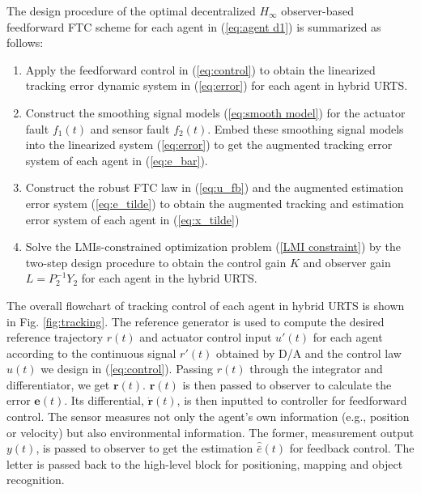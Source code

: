 \documentclass{ieeeaccess}
\begin{document}
The design procedure of the optimal decentralized $H_\infty$ observer-based feedforward FTC scheme for each agent in (\ref{eq:agent d1}) is summarized as follows:
\begin{enumerate}
    \item Apply the feedforward control in (\ref{eq:control}) to obtain the linearized tracking error dynamic system in (\ref{eq:error}) for each agent in hybrid URTS.
    \item Construct the smoothing signal models (\ref{eq:smooth model}) for the actuator fault $f_1(t)$ and sensor fault $f_2(t)$. Embed these smoothing signal models into the linearized system (\ref{eq:error}) to get the augmented tracking error system of each agent in (\ref{eq:e_bar}).
    \item Construct the robust FTC law in (\ref{eq:u_fb}) and the augmented estimation error system (\ref{eq:e_tilde}) to obtain the augmented tracking and estimation error system of each agent in (\ref{eq:x_tilde})
    \item Solve the LMIs-constrained optimization problem (\ref{LMI constraint}) by the two-step design procedure to obtain the control gain $K$ and observer gain $L=P_2^{-1}Y_2$ for each agent in the hybrid URTS.
\end{enumerate}

The overall flowchart of tracking control of each agent in hybrid URTS is shown in Fig. \ref{fig:tracking}. The reference generator is used to compute the desired reference trajectory $r(t)$ and actuator control input $u'(t)$ for each agent according to the continuous signal $r'(t)$ obtained by D/A and the control law $u(t)$ we design in (\ref{eq:control}). Passing $r(t)$ through the integrator and differentiator, we get $\pmb{r}(t)$. $\pmb{r}(t)$ is then passed to observer to calculate the error $\pmb{e}(t)$. Its differential, $\dot{\pmb{r}}(t)$, is then inputted to controller for feedforward control. The sensor measures not only the agent's own information (e.g., position or velocity) but also environmental information. The former, measurement output $y(t)$, is passed to observer to get the estimation $\hat{\bar{e}}(t)$ for feedback control. The letter is passed back to the high-level block for positioning, mapping and object recognition.
\end{document}
